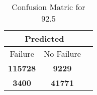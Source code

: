 \begin{table}[] 
\caption{Confusion Matric for 92.5} 
\label{Table: Prediction Accuracy-DMD92.5OnlySunEKF-resetReflection-Reflection} 
\centering 
\begin{tabular} 
 {@{}ccc@{}} 
\toprule 
\multicolumn{2}{c}{\textbf{Predicted}}
 \\ \midrule 
\multicolumn{1}{|c|}{Failure} & 
\multicolumn{1}{c|}{No Failure}
 \\ \midrule 
\multicolumn{1}{|c|}{\color{green}\textbf{115728}} & 
\multicolumn{1}{c|}{\color{red}\textbf{9229}}
 \\ \midrule 
\multicolumn{1}{|c|}{\color{red}\textbf{3400}} & 
\multicolumn{1}{c|}{\color{green}\textbf{41771}}
 \\ \bottomrule 
\end{tabular} 
\end{table} 
